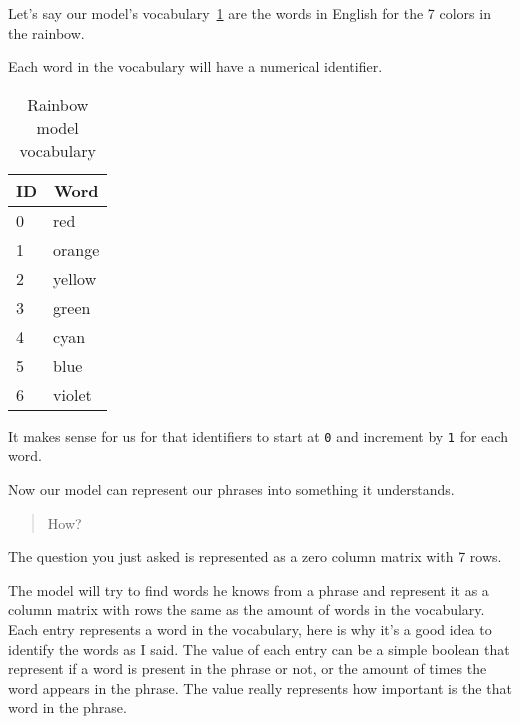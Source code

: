\documentclass[a4paper,12pt]{article}
\theoremstyle{mytheoremstyle}
\theoremstyle{mytheoremstyle}
\theoremstyle{myproblemstyle}
\begin{document}
    Let's say {our model's vocabulary}~\ref{tab:rainbow_model_vocab} are
    the words in English for the 7 colors in the rainbow.

    Each word in the vocabulary will have a numerical identifier.

    \begin{table}
        \caption{Rainbow model vocabulary}\label{tab:rainbow_model_vocab}
        \begin{center}
            \begin{tabular}[c]{l|l}
                \hline
                \multicolumn{1}{c|}{\textbf{ID}} &
                \multicolumn{1}{c}{\textbf{Word}} \\
                \hline
                0 & red \\
                1 & orange \\
                2 & yellow \\
                3 & green \\
                4 & cyan \\
                5 & blue \\
                6 & violet \\

                \hline
            \end{tabular}
        \end{center}
    \end{table}

    It makes sense for us for that identifiers to start at \texttt{0} and
    increment by \texttt{1} for each word.

    Now our model can represent our phrases into something it understands.

    \begin{quote}
        How?
    \end{quote}

    The question you just asked is represented as a zero column matrix with 7
    rows.

    The model will try to find words he knows from a phrase and represent it as
    a column matrix with rows the same as the amount of words in the
    vocabulary. Each entry represents a word in the vocabulary, here is why
    it's a good idea to identify the words as I said. The value of each entry
    can be a simple boolean that represent if a word is present in the phrase
    or not, or the amount of times the word appears in the phrase. The value
    really represents how important is the that word in the phrase.
\end{document}
